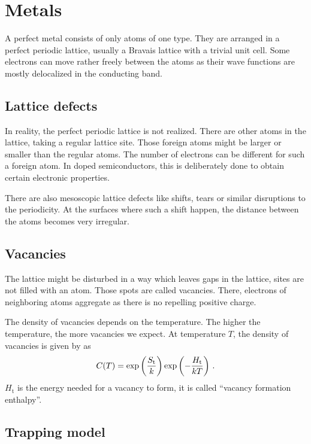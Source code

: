 \documentclass[11pt, english, fleqn, DIV=15, headinclude, BCOR=2cm]{scrreprt}
\begin{document}
\section{Metals}

A perfect metal consists of only atoms of one type. They are arranged in a
perfect periodic lattice, usually a Bravais lattice with a trivial unit cell.
Some electrons can move rather freely between the atoms as their wave functions
are mostly delocalized in the conducting band.

\subsection{Lattice defects}

In reality, the perfect periodic lattice is not realized. There are other atoms
in the lattice, taking a regular lattice site. Those foreign atoms might be
larger or smaller than the regular atoms. The number of electrons can be
different for such a foreign atom. In doped semiconductors, this is
deliberately done to obtain certain electronic properties.

There are also mesoscopic lattice defects like shifts, tears or similar
disruptions to the periodicity. At the surfaces where such a shift happen,
the distance between the atoms becomes very irregular.

\subsection{Vacancies}

The lattice might be disturbed in a way which leaves gaps in the lattice, sites
are not filled with an atom. Those spots are called vacancies. There, electrons
of neighboring atoms aggregate as there is no repelling positive charge.

The density of vacancies depends on the temperature. The higher the
temperature, the more vacancies we expect. At temperature $T$, the density of
vacancies is given by \textcite[(3)]{Weiler/Vacancy_formation} as
\[
        C(T) = \exp\left( \frac{S_\text{t}}{k} \right) \exp\left( -\frac{H_\mathrm t}{kT} \right) \,.
\]
$H_\mathrm t$ is the energy needed for a vacancy to form, it is called
\enquote{vacancy formation enthalpy}.

\subsection{Trapping model}
\label{ssec:tra_mod}
\end{document}
